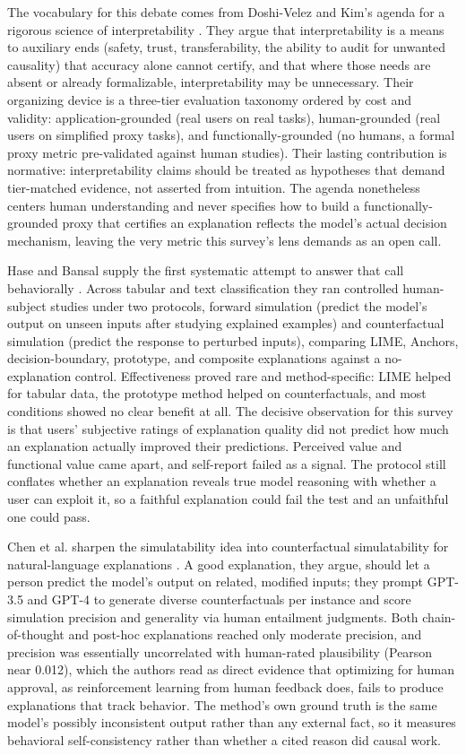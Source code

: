 \documentclass[conference]{IEEEtran}
\begin{document}
The vocabulary for this debate comes from Doshi-Velez and Kim's agenda for a rigorous science of interpretability \cite{ref24}. They argue that interpretability is a means to auxiliary ends (safety, trust, transferability, the ability to audit for unwanted causality) that accuracy alone cannot certify, and that where those needs are absent or already formalizable, interpretability may be unnecessary. Their organizing device is a three-tier evaluation taxonomy ordered by cost and validity: application-grounded (real users on real tasks), human-grounded (real users on simplified proxy tasks), and functionally-grounded (no humans, a formal proxy metric pre-validated against human studies). Their lasting contribution is normative: interpretability claims should be treated as hypotheses that demand tier-matched evidence, not asserted from intuition. The agenda nonetheless centers human understanding and never specifies how to build a functionally-grounded proxy that certifies an explanation reflects the model's actual decision mechanism, leaving the very metric this survey's lens demands as an open call.

Hase and Bansal supply the first systematic attempt to answer that call behaviorally \cite{ref25}. Across tabular and text classification they ran controlled human-subject studies under two protocols, forward simulation (predict the model's output on unseen inputs after studying explained examples) and counterfactual simulation (predict the response to perturbed inputs), comparing LIME, Anchors, decision-boundary, prototype, and composite explanations against a no-explanation control. Effectiveness proved rare and method-specific: LIME helped for tabular data, the prototype method helped on counterfactuals, and most conditions showed no clear benefit at all. The decisive observation for this survey is that users' subjective ratings of explanation quality did not predict how much an explanation actually improved their predictions. Perceived value and functional value came apart, and self-report failed as a signal. The protocol still conflates whether an explanation reveals true model reasoning with whether a user can exploit it, so a faithful explanation could fail the test and an unfaithful one could pass.

Chen et al. sharpen the simulatability idea into counterfactual simulatability for natural-language explanations \cite{ref18}. A good explanation, they argue, should let a person predict the model's output on related, modified inputs; they prompt GPT-3.5 and GPT-4 to generate diverse counterfactuals per instance and score simulation precision and generality via human entailment judgments. Both chain-of-thought and post-hoc explanations reached only moderate precision, and precision was essentially uncorrelated with human-rated plausibility (Pearson near 0.012), which the authors read as direct evidence that optimizing for human approval, as reinforcement learning from human feedback does, fails to produce explanations that track behavior. The method's own ground truth is the same model's possibly inconsistent output rather than any external fact, so it measures behavioral self-consistency rather than whether a cited reason did causal work.
\end{document}
